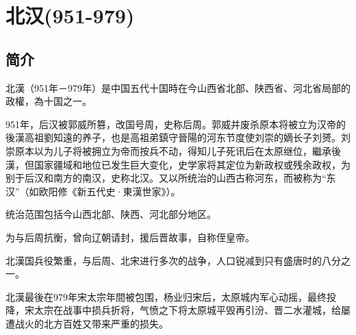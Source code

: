 

\section{北汉\tiny(951-979)}

\subsection{简介}

北漢（951年－979年）是中国五代十国時在今山西省北部、陕西省、河北省局部的政權，為十国之一。

951年，后汉被郭威所篡，改国号周，史称后周。郭威并废杀原本将被立为汉帝的後漢高祖劉知遠的养子，也是高祖弟鎮守晉陽的河东节度使刘崇的嫡长子刘赟。刘崇原本以为儿子将被拥立为帝而按兵不动，得知儿子死讯后在太原继位，繼承後漢，但国家疆域和地位已发生巨大变化，史学家将其定位为新政权或残余政权，为别于后汉和南方的南汉，史称北汉。又以所统治的山西古称河东，而被称为“东汉”（如欧阳修《新五代史·東漢世家》）。

统治范围包括今山西北部、陕西、河北部分地区。

为与后周抗衡，曾向辽朝请封，援后晋故事，自称侄皇帝。

北漢国兵役繁重，与后周、北宋进行多次的战争，人口锐减到只有盛唐时的八分之一。

北漢最後在979年宋太宗年間被包围，杨业归宋后，太原城内军心动摇，最终投降，宋太宗在战事中损兵折将，气愤之下将太原城平毁再引汾、晋二水灌城，给屡遭战火的北方百姓又带来严重的损失。







